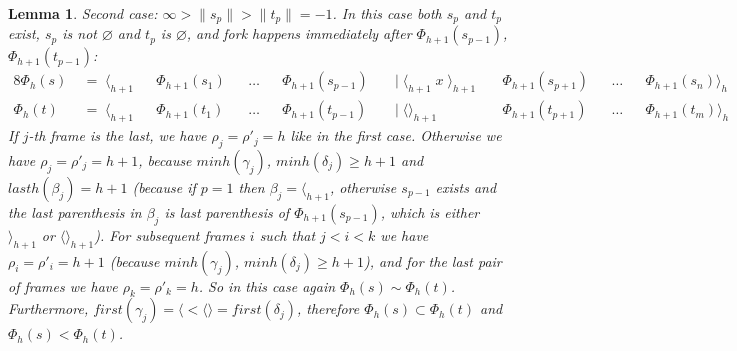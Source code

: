 \documentclass[AMA,STIX1COL]{WileyNJD-v2}
\newcommand{\Xl}{\langle}
\newcommand{\Xr}{\rangle}
\newcommand{\Xm}{\langle\!\rangle}
\newtheorem{XLem}{Lemma}
\begin{document}
\begin{XLem}
    \medskip

    Second case: $\infty > \|s_p\| > \|t_p\| = -1$.
    In this case both $s_p$ and $t_p$ exist,
    $s_p$ is not $\varnothing$ and $t_p$ is $\varnothing$,
    and fork happens immediately after $\Phi_{h+1}(s_{p-1})$, $\Phi_{h+1}(t_{p-1})$:
    \begin{alignat*}{8}
        \Phi_{h}(s) &\;=\; \Xl_{h+1} &&\Phi_{h+1}(s_1) &&\dots &&\Phi_{h+1}(s_{p-1})
            &&\;\big|\; \Xl_{h+1} \; x \; \Xr_{h+1} \; &&\Phi_{h+1}(s_{p+1}) &&\dots &&\Phi_{h+1}(s_n) \Xr_{h} \\[-0.5em]
        \Phi_{h}(t) &\;=\; \Xl_{h+1} &&\Phi_{h+1}(t_1) &&\dots &&\Phi_{h+1}(t_{p-1})
            &&\;\big|\; \Xm_{h+1} \;\;\;\;\;\;         &&\Phi_{h+1}(t_{p+1}) &&\dots &&\Phi_{h+1}(t_m) \Xr_{h}
    \end{alignat*}
    If $j$-th frame is the last, we have $\rho_j = \rho'_j = h$ like in the first case.
    Otherwise we have $\rho_j = \rho'_j = h + 1$,
    because $minh(\gamma_j)$, $minh(\delta_j) \geq h + 1$
    and $lasth (\beta_j) = h + 1$
    (because if $p = 1$ then $\beta_j = \Xl_{h+1}$, otherwise
    $s_{p-1}$ exists and the last parenthesis in $\beta_j$
    is last parenthesis of $\Phi_{h+1}(s_{p-1})$, which is either $\Xr_{h+1}$ or $\Xm_{h+1}$).
    For subsequent frames $i$ such that $j < i < k$ we have $\rho_i = \rho'_i = h + 1$
    (because $minh(\gamma_j)$, $minh(\delta_j) \geq h + 1$),
    and for the last pair of frames we have $\rho_k = \rho'_k = h$.
    So in this case again $\Phi_{h}(s) \sim \Phi_{h}(t)$.
    Furthermore, $first (\gamma_j) = \Xl < \Xm = first (\delta_j)$, therefore $\Phi_{h}(s) \subset \Phi_{h}(t)$
    and $\Phi_{h}(s) < \Phi_{h}(t)$.

    \medskip


\end{XLem}
\end{document}
